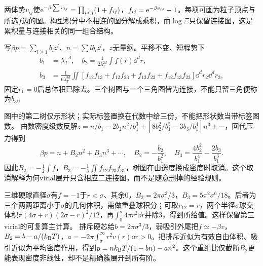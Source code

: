 \label{ch:clusters}
两体势$v_{ij}$使$\mathrm e^{-\beta\sum v_{ij}}=\prod_{i<j}(1+f_{ij})$，$f_{ij}=\mathrm e^{-\beta v_{ij}}-1$。每项可画为粒子顶点与所选$f$边的图。构型积分中不相连的图分解成乘积，而$\log\Xi$只保留连接图，这是累积量与连接相关的同一组合结构。

写$\beta p=\sum_{l\ge1}b_lz^l$、$n=\sum l b_lz^l$，$z$无量纲。平移不变、短程势下
\begin{align}
b_1&=\lambda_T^{-d},\quad b_2=\frac1{2\lambda_T^{2d}}\int f(r)\dd^dr,\\
b_3&=\frac1{6\lambda_T^{3d}}\iint[ f_{12}f_{13}+f_{12}f_{23}+f_{13}f_{23}+f_{12}f_{13}f_{23}]\dd^dr_2\dd^dr_3,
\end{align}
固定$r_1=0$后总体积已除去。三个树图与一个三角图皆为连接，不能只留三角便称为$b_3$。
\begin{center}\end{center}
图中的第二树仅示形状；实际标签置换在代数中给三份，不能把形状数当带标签图数。
由数密度级数反解$z=n/b_1-2b_2n^2/b_1^3+[8b_2^2/b_1^5-3b_3/b_1^4]n^3+\cdots$，回代压力得到
\begin{equation}
\beta p=n+B_2n^2+B_3n^3+\cdots,\quad B_2=-\frac{b_2}{b_1^2},\quad B_3=\frac{4b_2^2}{b_1^4}-\frac{2b_3}{b_1^3}.
\end{equation}
因此$B_2=-\frac12\int f$，$B_3=-\frac13\iint f_{12}f_{23}f_{31}$，树图在由逸度换成密度时取消。这个取消解释为何virial展开只含相应二连接图，而不是随意删掉的经验规则。

三维硬球直径$\sigma$有$f=-1$于$r<\sigma$、其余0，$B_2=2\pi\sigma^3/3$，$B_3=5\pi^2\sigma^6/18$。后者为三个两两距离小于$\sigma$的几何体积，需做重叠球积分；可取$r_{12}=r$，两个半径$\sigma$球交体积$\pi(4\sigma+r)(2\sigma-r)^2/12$，再$\int_0^\sigma4\pi r^2\dd r$并除3，得到所给值。这样保留第三virial的可复算主计算。
排斥硬芯给$b=2\pi\sigma^3/3$，弱吸引外尾把$f\simeq-\beta v$，$B_2=b-a/(k_{\mathrm B} T)$，$a=-2\pi\int_\sigma^\infty r^2v(r)\dd r>0$。把排斥近似为有效自由体积、吸引近似为平均密度作用，得到$p=nk_{\mathrm B} T/(1-bn)-an^2$。这个重组比仅截断$B_2$更能表现密度非线性，却不是精确簇展开到所有阶。

